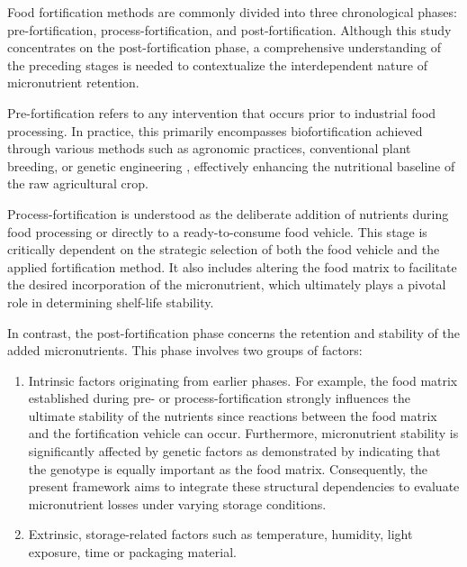 Food fortification methods are commonly divided into three chronological phases: pre-fortification, process-fortification, and post-fortification. Although this study concentrates on the post-fortification phase, a comprehensive understanding of the preceding stages is needed to contextualize the interdependent nature of micronutrient retention. \par
Pre-fortification refers to any intervention that occurs prior to industrial food processing. In practice, this primarily encompasses biofortification achieved through various methods such as agronomic practices, conventional plant breeding, or genetic engineering \autocite{1ofori}, effectively enhancing the nutritional baseline of the raw agricultural crop.  \par Process-fortification is understood as the deliberate addition of nutrients during food processing or directly to a ready-to-consume food vehicle. This stage is critically dependent on the strategic selection of both the food vehicle and the applied fortification method. It also includes altering the food matrix to facilitate the desired incorporation of the micronutrient, which ultimately plays a pivotal role in determining shelf-life stability. \par 

In contrast, the post-fortification phase concerns the retention and stability of the added micronutrients. This phase involves two groups of factors: 

\begin{enumerate}
\item Intrinsic factors originating from earlier phases. For example, the food matrix established during pre- or process-fortification strongly influences the ultimate stability of the nutrients since reactions between the food matrix and the fortification vehicle can occur. Furthermore, micronutrient stability is significantly affected by genetic factors as demonstrated by \citet{dutta} indicating that the genotype is equally important as the food matrix. Consequently, the present framework aims to integrate these structural dependencies to evaluate micronutrient losses under varying storage conditions. 
\item Extrinsic, storage-related factors such as temperature, humidity, light exposure, time or packaging material. 
\end{enumerate}

